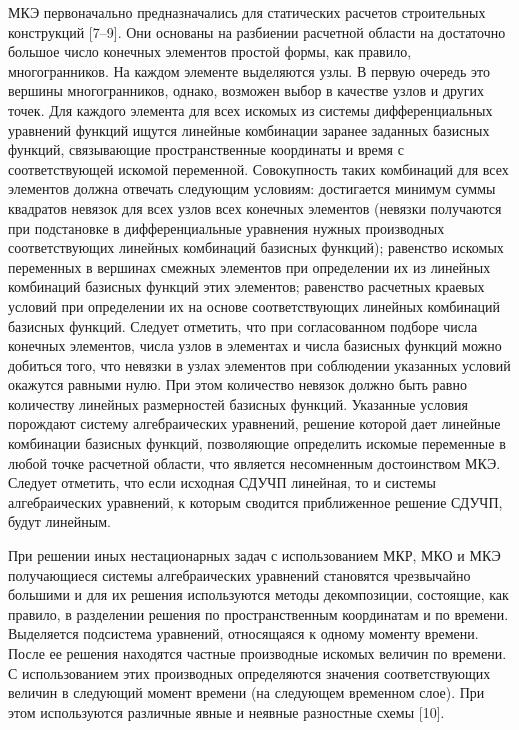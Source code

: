 \documentclass[a4paper,12pt]{article}
\begin{document}
МКЭ первоначально предназначались для статических расчетов строительных
конструкций [7–9]. Они основаны на разбиении расчетной области на
достаточно большое число конечных элементов простой формы, как правило,
многогранников.  На каждом элементе выделяются узлы. В первую очередь это
вершины многогранников, однако, возможен выбор в качестве узлов и других
точек. Для каждого элемента для всех искомых из системы дифференциальных
уравнений функций ищутся линейные комбинации заранее заданных базисных
функций, связывающие пространственные координаты и время с соответствующей
искомой переменной. Совокупность таких комбинаций для всех элементов должна
отвечать следующим условиям: достигается минимум суммы квадратов невязок
для всех узлов всех конечных элементов (невязки получаются при подстановке
в дифференциальные уравнения нужных производных соответствующих линейных
комбинаций базисных функций); равенство искомых переменных в вершинах
смежных элементов при определении их из линейных комбинаций базисных
функций этих элементов; равенство расчетных краевых условий при определении
их на основе соответствующих линейных комбинаций базисных функций. Следует
отметить, что при согласованном подборе числа конечных элементов, числа
узлов в элементах и числа базисных функций можно добиться того, что невязки
в узлах элементов при соблюдении указанных условий окажутся равными нулю.
При этом количество невязок должно быть равно количеству линейных
размерностей базисных функций.  Указанные условия порождают систему
алгебраических уравнений, решение которой дает линейные комбинации базисных
функций, позволяющие определить искомые переменные в любой точке расчетной
области, что является несомненным достоинством МКЭ. Следует отметить, что
если исходная СДУЧП линейная, то и системы алгебраических уравнений, к
которым сводится приближенное решение СДУЧП, будут линейным.

При решении иных нестационарных задач с использованием МКР, МКО и МКЭ
получающиеся системы алгебраических уравнений становятся чрезвычайно
большими и для их решения используются методы декомпозиции, состоящие, как
правило, в разделении решения по пространственным координатам и по времени.
Выделяется подсистема уравнений, относящаяся к одному моменту времени.
После ее решения находятся частные производные искомых величин по времени.
С использованием этих производных определяются значения соответствующих
величин в следующий момент времени (на следующем временном слое). При этом
используются различные явные и неявные разностные схемы [10].
\end{document}
